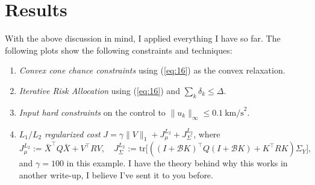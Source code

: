 \documentclass[12pt]{article}
\newtheorem{lem}{Lemma}
\begin{document}
%

\section*{Results}
With the above discussion in mind, I applied everything I have so far. The following plots show the following constraints and techniques:
\begin{enumerate}
	\item \textit{Convex cone chance constraints} using (\ref{eq:16}) as the convex relaxation.
	\item \textit{Iterative Risk Allocation} using (\ref{eq:16}) and $\sum_{k} \delta_k \leq \Delta$.
	\item \textit{Input hard constraints} on the control to $\|u_k\|_{\infty} \leq 0.1 \ \textrm{km/s}^2$.
	\item  $L_1/L_2$ \textit{regularized cost} $J = \gamma \|V\|_1 + J_{\mu}^{L_2} + J_{\Sigma}^{L_2}$, where 
	\begin{equation*}
	J_{\mu}^{L_2} := \bar{X}^\intercal Q \bar{X} + V^\intercal R V, \quad J_{\Sigma}^{L_2} := \textrm{tr}\big[( (I+\mathcal{B}K)^\intercal Q (I+\mathcal{B}K) + K^\intercal R K) \Sigma_Y\big],
	\end{equation*}
	and $\gamma = 100$ in this example. I have the theory behind why this works in another write-up, I believe I've sent it to you before.
\end{enumerate}
\end{document}
